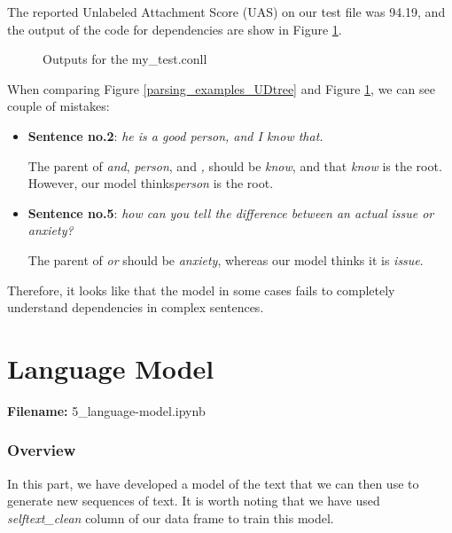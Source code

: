 \documentclass[12pt, a4paper]{article}
\begin{document}
	The reported Unlabeled Attachment Score (UAS) on our test file was 94.19, and the output of the code for dependencies are show in Figure \ref{parsing_output}. 
	\begin{figure}[H]
		\caption{Outputs for the my\_test.conll}
		\label{parsing_output}
	\end{figure}
	
	When comparing Figure \ref{parsing_examples_UDtree} and Figure \ref{parsing_output}, we can see couple of mistakes:
	\begin{itemize}
		\item \textbf{Sentence no.2}: \emph{he is a good person, and I know that.}
		
		The parent of \emph{and}, \emph{person}, and \emph{,} should be \emph{know}, and that \emph{know} is the root. However, our model thinks\emph{person} is the root.
		
		\item \textbf{Sentence no.5}:
		\emph{how can you tell the difference between an actual issue or anxiety?}
		
		The parent of \emph{or} should be \emph{anxiety}, whereas our model thinks it is \emph{issue}.
	\end{itemize}
	
	Therefore, it looks like that the model in some cases fails to completely understand dependencies in complex sentences. 
	
	\newpage
	\part{Language Model}
	\large{\textbf{Filename:} 5\_language-model.ipynb}
	\section{Overview}
	In this part, we have developed a model of the text that we can then use to generate new sequences of text. It is worth noting that we have used \emph{selftext\_clean} column of our data frame to train this model.
	
\end{document}
